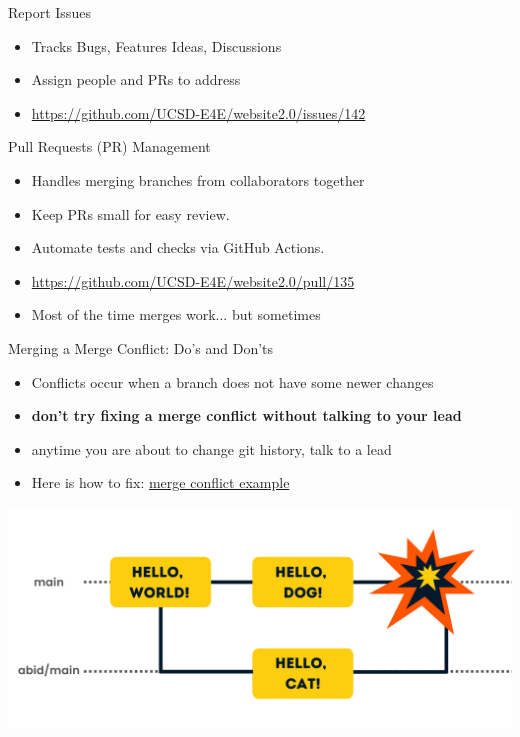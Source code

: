 \documentclass[aspectratio=169]{beamer}
\begin{document}
\begin{frame}{Report Issues}
    \begin{itemize}
        \item Tracks Bugs, Features Ideas, Discussions
        \item Assign people and PRs to address
        \item \href{https://github.com/UCSD-E4E/website2.0/issues/142}{https://github.com/UCSD-E4E/website2.0/issues/142}
    \end{itemize}
\end{frame}

\begin{frame}{Pull Requests (PR) Management}
    \begin{itemize}
        \item Handles merging branches from collaborators together
        \item Keep PRs small for easy review.
        \item Automate tests and checks via GitHub Actions.
        \item \href{https://github.com/UCSD-E4E/website2.0/pull/135}{https://github.com/UCSD-E4E/website2.0/pull/135}
        \item Most of the time merges work... but sometimes
    \end{itemize}
\end{frame}

\begin{frame}{Merging a Merge Conflict: Do's and Don'ts}
    \begin{itemize}
        \item Conflicts occur when a branch does not have some newer changes
        \item \textbf{don't try fixing a merge conflict without talking to your lead}
        \item anytime you are about to change git history, talk to a lead
        \item Here is how to fix: \href{https://github.com/UCSD-E4E/website2.0/pull/144}{merge conflict example}
    \end{itemize}
    \begin{center}
        \includegraphics[scale=.25]{merge_conflict_datacamp.png}
    \end{center}
\end{frame}
\end{document}
